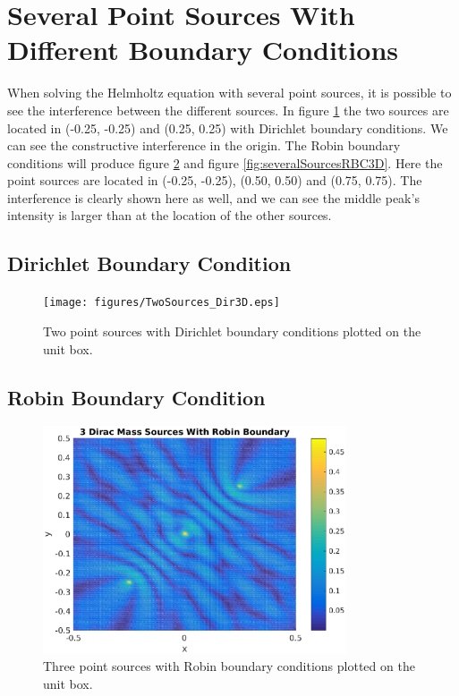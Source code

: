 \documentclass[10pt,a4paper]{article}
\begin{document}
\section*{Several Point Sources With Different Boundary Conditions}
When solving the Helmholtz equation with several point sources, it is possible to see the interference between the different sources. In figure \ref{fig:severalSourcesDBC3D} the two sources are located in (-0.25, -0.25) and (0.25, 0.25) with Dirichlet boundary conditions. We can see the constructive interference in the origin. The Robin boundary conditions will produce figure \ref{fig:severalSourcesRBC2D} and figure \ref{fig:severalSourcesRBC3D}. Here the point sources are located in (-0.25, -0.25), (0.50, 0.50) and (0.75, 0.75). The interference is clearly shown here as well, and we can see the middle peak's intensity is larger than at the location of the other sources.

\subsection*{Dirichlet Boundary Condition}
\begin{figure}[H]
\centering
    \texttt{[image: figures/TwoSources\_Dir3D.eps]}
	\caption{Two point sources with Dirichlet boundary conditions plotted on the unit box.}
  \label{fig:severalSourcesDBC3D}
\end{figure}

\subsection*{Robin Boundary Condition}

\begin{figure}[H]
\centering
    \includegraphics[width=0.8\textwidth]{figures/ThreeSources_2D.eps}
	\caption{Three point sources with Robin boundary conditions plotted on the unit box.}
  \label{fig:severalSourcesRBC2D}
\end{figure}
\end{document}
